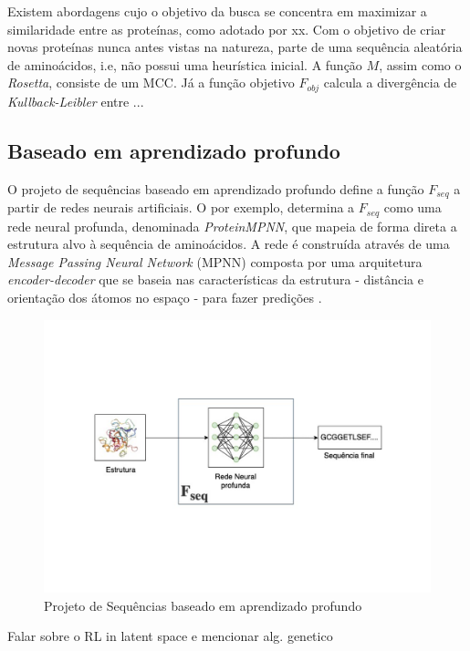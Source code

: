 
{\color{red} Existem abordagens cujo o objetivo da busca se concentra em maximizar a similaridade entre as proteínas, como adotado por xx. Com o objetivo de criar novas proteínas nunca antes vistas na natureza, \cite{DeNovo} parte de uma sequência aleatória de aminoácidos, i.e, não possui uma heurística inicial. A função $M$, assim como o \textit{Rosetta}, consiste de um MCC. Já a função objetivo $F_{obj}$ calcula a divergência de \textit{Kullback-Leibler} entre ...}



\subsection{Baseado em aprendizado profundo}

O projeto de sequências baseado em aprendizado profundo define a função $F_{seq}$ a partir de redes neurais artificiais. 
O \cite{ProteinMPNN} por exemplo, determina a $F_{seq}$ como uma rede neural profunda, denominada \textit{ProteinMPNN}, 
que mapeia de forma direta a estrutura alvo à sequência de aminoácidos. 
A rede é construída através de uma \textit{Message Passing Neural Network} (MPNN) composta por uma arquitetura \textit{encoder-decoder} 
que se baseia nas características da estrutura - distância e orientação dos átomos no espaço - para fazer predições \cite{ProteinMPNN}. 

\begin{figure}[H]
  \centering
  \includegraphics[width=.8\textwidth]{figuras/metodologia-DeepLearningBased.pdf}
  \caption{Projeto de Sequências baseado em aprendizado profundo} 
\end{figure}

{\color{red} Falar sobre o RL in latent space e mencionar alg. genetico}

